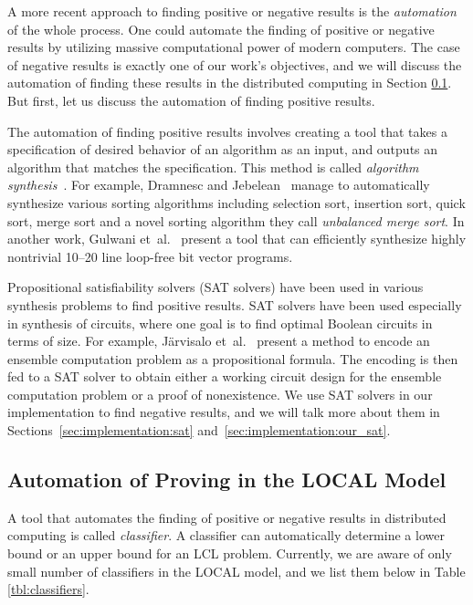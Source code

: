 A more recent approach to finding positive or negative results is the \emph{automation} of the whole process.
One could automate the finding of positive or negative results by utilizing massive computational power of modern computers.
The case of negative results is exactly one of our work's objectives, and we will discuss the automation of finding these results in the distributed computing in Section \ref{sec:prior_work:automation_of_proving_in_local_model}.
But first, let us discuss the automation of finding positive results.

The automation of finding positive results involves creating a tool that takes a specification of desired behavior of an algorithm as an input, and outputs an algorithm that matches the specification.
This method is called \emph{algorithm synthesis}~\cite{DBLP:phd/basesearch/Rybicki16}.
For example, Dramnesc and Jebelean\ \cite{DBLP:journals/jsc/DramnescJ15} manage to automatically synthesize various sorting algorithms including selection sort, insertion sort, quick sort, merge sort and a novel sorting algorithm they call \emph{unbalanced merge sort}.
In another work, Gulwani et~al.\ \cite{DBLP:conf/pldi/GulwaniJTV11} present a tool that can efficiently synthesize highly nontrivial 10--20 line loop-free bit vector programs.

Propositional satisfiability solvers (SAT solvers) have been used in various synthesis problems to find positive results.
SAT solvers have been used especially in synthesis of circuits, where one goal is to find optimal Boolean circuits in terms of size.
For example, Järvisalo et~al.\ \cite{DBLP:conf/sat/JarvisaloKKK12} present a method to encode an ensemble computation problem as a propositional formula.
The encoding is then fed to a SAT solver to obtain either a working circuit design for the ensemble computation problem or a proof of nonexistence.
We use SAT solvers in our implementation to find negative results, and we will talk more about them in Sections~\ref{sec:implementation:sat} and~\ref{sec:implementation:our_sat}.


\subsection{Automation of Proving in the LOCAL Model} \label{sec:prior_work:automation_of_proving_in_local_model}


A tool that automates the finding of positive or negative results in distributed computing is called \emph{classifier}.
A classifier can automatically determine a lower bound or an upper bound for an LCL problem.
Currently, we are aware of only small number of classifiers in the LOCAL model, and we list them below in Table \ref{tbl:classifiers}.

